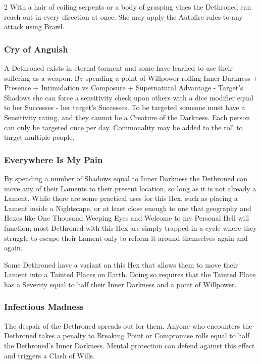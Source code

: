 \begin{multicols}{2}
With a hair of coiling serpents or a body of grasping vines the Dethroned can reach out in every direction at once. She may apply the Autofire rules to any attack using Brawl.

\subsubsection*{Cry of Anguish}

A Dethroned exists in eternal torment and some have learned to use their suffering as a weapon. By spending a point of Willpower rolling Inner Darkness + Presence + Intimidation vs Composure + Supernatural Advantage - Target's Shadows she can force a sensitivity check upon others with a dice modifier equal to her Successes - her target's Successes. To be targeted someone must have a Sensitivity rating, and they cannot be a Creature of the Darkness. Each person can only be targeted once per day. Commonality may be added to the roll to target multiple people.

\subsubsection*{Everywhere Is My Pain}

By spending a number of Shadows equal to Inner Darkness the Dethroned can move any of their Laments to their present location, so long as it is not already a Lament. While there are some practical uses for this Hex, such as placing a Lament inside a Nightscape, or at least close enough to one that geography and Hexes like One Thousand Weeping Eyes and Welcome to my Personal Hell will function; most Dethroned with this Hex are simply trapped in a cycle where they struggle to escape their Lament only to reform it around themselves again and again. 

Some Dethroned have a variant on this Hex that allows them to move their Lament into a Tainted Places on Earth. Doing so requires that the Tainted Place has a Severity equal to half their Inner Darkness and a point of Willpower. 

\subsubsection*{Infectious Madness}

The despair of the Dethroned spreads out for them. Anyone who encounters the Dethroned takes a penalty to Breaking Point or Compromise rolls equal to half the Dethroned's Inner Darkness. Mental protection can defend against this effect and triggers a Clash of Wills. 


\end{multicols}
